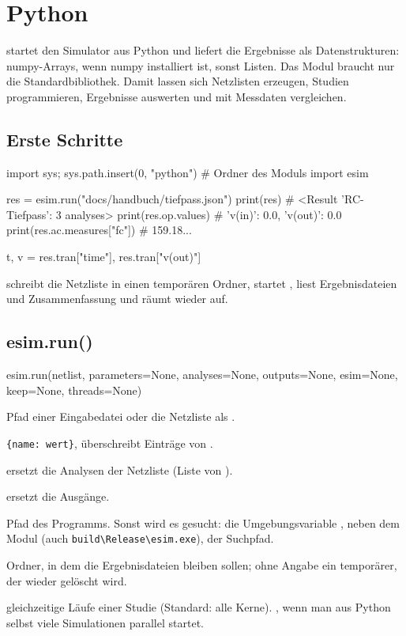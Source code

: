 \chapter{Python}
\label{kap:python}

 startet den Simulator aus Python und liefert die
Ergebnisse als Datenstrukturen: numpy-Arrays, wenn numpy installiert ist,
sonst Listen. Das Modul braucht nur die Standardbibliothek. Damit lassen
sich Netzlisten erzeugen, Studien programmieren, Ergebnisse auswerten und
mit Messdaten vergleichen.

\section{Erste Schritte}

\begin{python}
import sys; sys.path.insert(0, "python")    # Ordner des Moduls
import esim

res = esim.run("docs/handbuch/tiefpass.json")
print(res)                  # <Result 'RC-Tiefpass': 3 analyses>
print(res.op.values)        # {'v(in)': 0.0, 'v(out)': 0.0}
print(res.ac.measures["fc"])   # 159.18...

t, v = res.tran["time"], res.tran["v(out)"]
\end{python}

 schreibt die Netzliste in einen temporären Ordner, startet
\esim, liest Ergebnisdateien und Zusammenfassung und räumt wieder auf.

\section{esim.run()}

\begin{python}
esim.run(netlist, parameters=None, analyses=None, outputs=None,
         esim=None, keep=None, threads=None)
\end{python}

\begin{description}[style=nextline,leftmargin=2em]
  \item[\code{netlist}] Pfad einer Eingabedatei oder die Netzliste als
    .
  \item[\code{parameters}] \texttt{\{name: wert\}}, überschreibt Einträge von
    .
  \item[\code{analyses}] ersetzt die Analysen der Netzliste (Liste von
    ).
  \item[\code{outputs}] ersetzt die Ausgänge.
  \item[\code{esim}] Pfad des Programms. Sonst wird es gesucht: die
    Umgebungsvariable ,  neben dem Modul
    (auch \texttt{build\textbackslash Release\textbackslash esim.exe}), der
    Suchpfad.
  \item[\code{keep}] Ordner, in dem die Ergebnisdateien bleiben sollen;
    ohne Angabe ein temporärer, der wieder gelöscht wird.
  \item[\code{threads}] gleichzeitige Läufe einer Studie (Standard: alle
    Kerne). , wenn man aus Python selbst viele Simulationen parallel
    startet.
\end{description}

